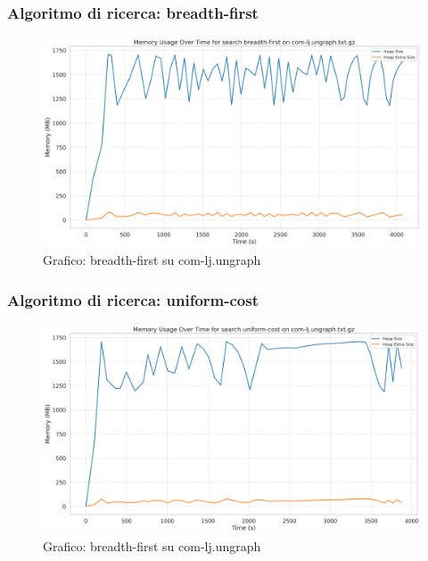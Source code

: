 \documentclass{article}
\begin{document}
\subsubsection{Algoritmo di ricerca: breadth-first}
\begin{figure}[htbp]\centering
\includegraphics[width=\textwidth]{../plots/com-lj.ungraph_breadth-first.png}
\caption{Grafico: breadth-first su com-lj.ungraph}
\end{figure}
\subsubsection{Algoritmo di ricerca: uniform-cost}
\begin{figure}[htbp]\centering
\includegraphics[width=\textwidth]{../plots/com-lj.ungraph_uniform-cost.png}
\caption{Grafico: breadth-first su com-lj.ungraph}
\end{figure}
\end{document}
